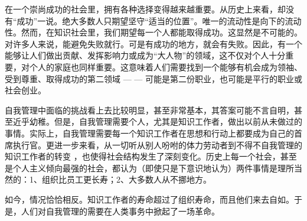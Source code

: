 \documentclass[a4paper,12pt,lang=cn,fontset = windows]{elegantpaper} %
\begin{document}
在一个崇尚成功的社会里，拥有各种选择变得越来越重要。从历史上来看，却没有“成功”一说。绝大多数人只期望坚守“适当的位置”。唯一的流动性是向下的流动性。然而，在知识社会里，我们期望每一个人都能取得成功。这显然是不可能的。对许多人来说，能避免失败就行。可是有成功的地方，就会有失败。因此，有一个能够让人们做出贡献、发挥影响力或成为“大人物”的领域，这不仅对个人十分重要，对个人的家庭也同样重要。这意味着人们需要找到一个能够有机会成为领袖、受到尊重、取得成功的第二领域 — — 可能是第二份职业，也可能是平行的职业或社会创业。

自我管理中面临的挑战看上去比较明显，甚至非常基本，其答案可能不言自明，甚至近乎幼稚。但是，自我管理需要个人，尤其是知识工作者，做出以前从未做过的事情。实际上，自我管理需要每一个知识工作者在思想和行动上都要成为自己的首席执行官。更进一步来看，从一切听从别人吩咐的体力劳动者到不得不自我管理的知识工作者的转变 ，也使得社会结构发生了深刻变化。历史上每一个社会，甚至是个人主义倾向最强的社会，都认为（即使只是下意识地认为）两件事情是理所当然的：1、组织比员工更长寿；2、大多数人从不挪地方。

如今，情况恰恰相反。知识工作者的寿命超过了组织寿命，而且他们来去自如。于是，人们对自我管理的需要在人类事务中掀起了一场革命。
\end{document}
